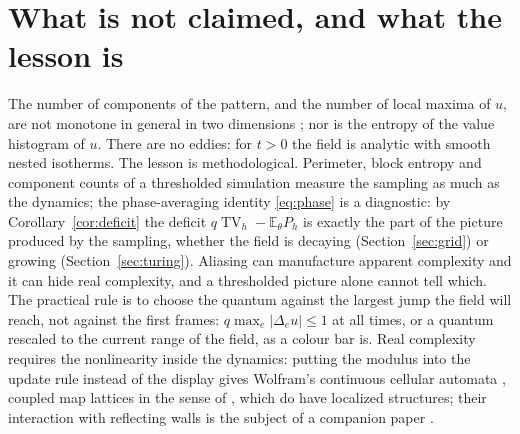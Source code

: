 \documentclass[11pt,a4paper]{article}
\theoremstyle{definition}
\theoremstyle{remark}
\newcommand{\E}{\mathbb{E}}
\newcommand{\TV}{\operatorname{TV}}
\begin{document}
\section{What is not claimed, and what the lesson is}\label{sec:lesson}

The number of components of the pattern, and the number of local maxima
of $u$, are not monotone in general in two dimensions
\cite{Magnanini}; nor is the entropy of the value histogram of $u$. There
are no eddies: for $t>0$ the field is analytic with smooth nested
isotherms. The lesson is methodological. Perimeter, block
entropy and component counts of a thresholded simulation measure the
sampling as much as the dynamics; the phase-averaging identity
\eqref{eq:phase} is a diagnostic: by Corollary~\ref{cor:deficit} the
deficit $q\TV_h-\E_\theta P_h$ is exactly the part of the picture
produced by the sampling, whether the field is decaying
(Section~\ref{sec:grid}) or growing (Section~\ref{sec:turing}). Aliasing
can manufacture apparent complexity and it can hide real complexity, and
a thresholded picture alone cannot tell which. The practical rule is to
choose the quantum against the largest jump the field will reach, not
against the first frames: $q\max_e|\Delta_eu|\le1$ at all times, or a
quantum rescaled to the current range of the field, as a colour bar
is. Real
complexity requires the nonlinearity inside the dynamics: putting the
modulus into the update rule instead of the display gives Wolfram's
continuous cellular automata \cite[ch.~4]{NKS}, coupled map lattices in
the sense of \cite{Kaneko}, which do have localized structures; their
interaction with reflecting walls is the subject of a companion paper
\cite{MirrorWalls}.
\end{document}

